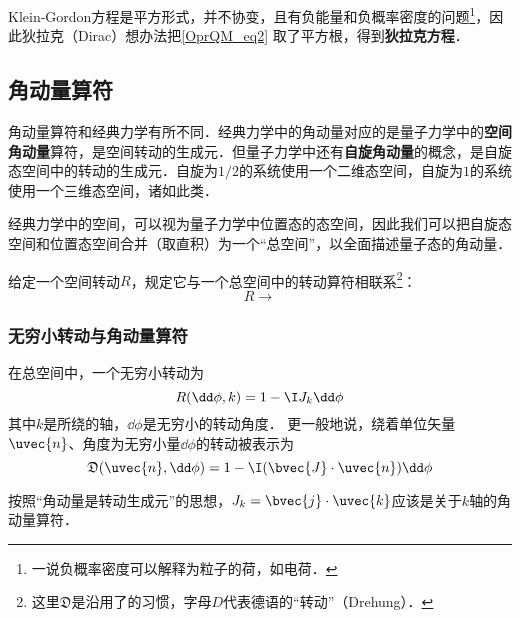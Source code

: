 Klein-Gordon方程是平方形式，并不协变，且有负能量和负概率密度的问题\footnote{一说负概率密度可以解释为粒子的荷，如电荷．}，因此狄拉克（Dirac）想办法把\autoref{OprQM_eq2} 取了平方根，得到\textbf{狄拉克方程}．



\subsection{角动量算符}\label{OprQM_sub1}

角动量算符和经典力学有所不同．经典力学中的角动量对应的是量子力学中的\textbf{空间角动量}算符，是空间转动的生成元．但量子力学中还有\textbf{自旋角动量}的概念，是自旋态空间中的转动的生成元．自旋为$1/2$的系统使用一个二维态空间，自旋为$1$的系统使用一个三维态空间，诸如此类．

经典力学中的空间，可以视为量子力学中位置态的态空间，因此我们可以把自旋态空间和位置态空间合并（取直积）为一个“总空间”，以全面描述量子态的角动量．

给定一个空间转动$R$，规定它与一个总空间中的转动算符相联系\footnote{这里$\mathfrak{D}$是沿用了\cite{Sakurai}的习惯，字母$D$代表德语的“转动”（Drehung）．}：
\begin{equation}
R\to \mathfrak{}
\end{equation}

\subsubsection{无穷小转动与角动量算符}


在总空间中，一个无穷小转动为
\begin{equation}
R(\dd \phi, k) = 1-\I J_k\dd \phi
\end{equation}
其中$k$是所绕的轴，$\dd \phi$是无穷小的转动角度．
更一般地说，绕着单位矢量$\uvec{n}$、角度为无穷小量$\dd \phi$的转动被表示为
\begin{equation}
\mathfrak{D}(\uvec{n}, \dd \phi) = 1-\I(\bvec{J}\cdot\uvec{n})\dd \phi
\end{equation}

按照“角动量是转动生成元”的思想，$J_k=\bvec{j}\cdot \uvec{k}$应该是关于$k$轴的角动量算符．




















